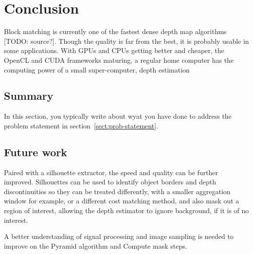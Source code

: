 \chapter{Conclusion}\label{chap:concl}

Block matching is currently one of the fastest dense depth map
algorithms [TODO: source?]. Though the quality is far from the best,
it is probably usable in some applications. With GPUs and CPUs getting
better and cheaper, the OpenCL and CUDA frameworks maturing, a regular
home computer has the computing power of a small super-computer, depth
estimation

\section{Summary}

In this section, you typically write about wyat you have done to
address the problem statement in section~\ref{sect:prob-statement}.



\section{Future work}

Paired with a silhouette extractor, the speed and quality can be
further improved. Silhouettes can be used to identify object borders
and depth discontinuities so they can be treated differently, with a
smaller aggregation window for example, or a different cost matching
method, and also mask out a region of interest, allowing the depth
estimator to ignore background, if it is of no interest.

A better understanding of signal processing and image sampling is
needed to improve on the Pyramid algorithm and Compute mask steps.